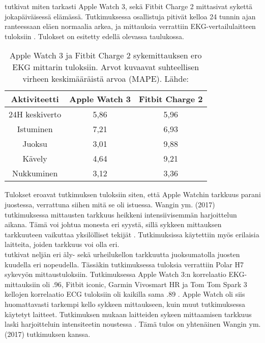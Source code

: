 \documentclass[utf8,bachelor,finnish]{bachelor}
\begin{document}
  \textcite{nelson_accuracy_2019} tutkivat miten tarkasti Apple Watch 3, sekä Fitbit Charge 2 mittasivat sykettä jokapäiväisessä elämässä.
   Tutkimuksessa osallistuja pitivät kelloa 24 tunnin ajan ranteessaan eläen normaalia arkea, ja mittauksia verrattiin
    EKG-vertailulaitteen tuloksiin \parencite{nelson_accuracy_2019}. Tulokset on esitetty edellä olevassa taulukossa.\\
    
    \begin{table}[H]
     \begin{center}
      \begin{tabular}{||c c c||}   
       \hline
       Aktiviteetti & Apple Watch 3 & Fitbit Charge 2\\ [0.5ex] 
       \hline\hline
       24H keskiverto & 5,86 & 5,96\\ 
       \hline
       Istuminen & 7,21 & 6,93\\ 
       \hline
       Juoksu & 3,01 & 9,88 \\
       \hline
       Kävely & 4,64 & 9,21\\
       \hline
       Nukkuminen & 3,12 & 3,36\\[1ex] 
       \hline
      \end{tabular}
    \caption{Apple Watch 3 ja Fitbit Charge 2 sykemittauksen ero EKG mittarin tuloksiin. Arvot kuvaavat suhteellisen virheen keskimääräistä arvoa (MAPE). Lähde: \textcite{nelson_accuracy_2019}}
     \end{center} 
    \end{table}

  Tulokset eroavat \textcite{wang_accuracy_2017} tutkimuksen tuloksiin siten, että Apple Watchin tarkkuus parani juostessa, verrattuna siihen mitä se oli istuessa. Wangin ym. (2017) tutkimuksessa
   mittausten tarkkuus heikkeni intensiivisemmän harjoittelun aikana. Tämä voi johtua monesta eri syystä, sillä sykkeen mittauksen tarkkuuteen vaikuttaa yksilölliset tekijät \parencite{koerber_accuracy_2022,pasadyn_accuracy_2019,hochstadt_continuous_2020}.
    Tutkimuksissa käytettiin myös erilaisia laitteita, joiden tarkkuus voi olla eri. \\

  \textcite{pasadyn_accuracy_2019} tutkivat neljän eri äly- sekä urheilukellon tarkkuutta juoksumatolla juosten kuudella eri nopeudella. Tässäkin tutkimuksessa tuloksia verrattiin
   Polar H7 sykevyön mittaustuloksiin. Tutkimuksessa Apple Watch 3:n korrelaatio EKG-mittauksiin oli .96, Fitbit iconic, Garmin Vivosmart HR ja Tom Tom Spark 3
    kellojen korrelaatio ECG tuloksiin oli kaikilla sama .89 \parencite{pasadyn_accuracy_2019}. Apple Watch oli siis huomattavasti tarkempi kello sykkeen mittaukseen,
     kuin muut tutkimuksessa käytetyt laitteet. Tutkimuksen mukaan laitteiden sykeen mittaamisen tarkkuus laski
      harjoitteluin intensiteetin noustessa \parencite{pasadyn_accuracy_2019}. Tämä tulos on yhtenäinen Wangin ym. (2017) tutkimuksen kanssa.\\
  
\end{document}
